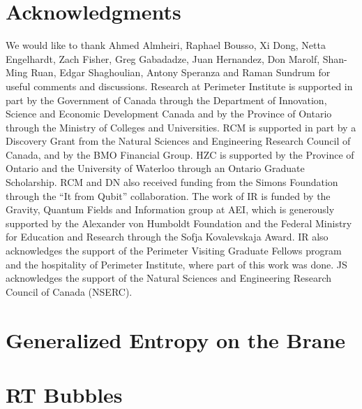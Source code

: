 \documentclass[onecolumn,amsmath,amssymb,nofootinbib,12pt]{article}
\renewcommand{\(}{\left(}
\renewcommand{\)}{\right)}
\renewcommand{\[}{\left[}
\renewcommand{\]}{\right]}
\begin{document}
\section*{Acknowledgments}
We would like to thank Ahmed Almheiri, Raphael Bousso, Xi Dong, Netta Engelhardt,  Zach Fisher, Greg Gabadadze, Juan Hernandez, Don Marolf, Shan-Ming Ruan, Edgar Shaghoulian, Antony Speranza and Raman Sundrum for useful comments and discussions. Research at Perimeter Institute is supported in part by the Government of Canada through the Department of Innovation, Science and Economic Development Canada and by the Province of Ontario through the Ministry of Colleges and Universities. RCM is supported in part by a Discovery Grant from the Natural Sciences and Engineering Research Council of Canada, and by the BMO Financial Group. HZC is supported by the Province of Ontario and the University of Waterloo through an Ontario Graduate Scholarship. RCM and DN also received funding from the Simons Foundation through the ``It from Qubit'' collaboration. The work of IR is funded by the Gravity, Quantum Fields and Information group at AEI, which is generously supported by the Alexander von Humboldt Foundation and the Federal Ministry for Education and Research  through the Sofja Kovalevskaja Award. IR also acknowledges the support of the Perimeter Visiting Graduate Fellows program and the hospitality of Perimeter Institute, where part of this work was done. JS acknowledges the support of the Natural Sciences and Engineering Research Council of Canada (NSERC).

\appendix

\section{Generalized Entropy on the Brane}\label{generalE}


\section{RT Bubbles}
\label{bubble}


%


%




\end{document}
